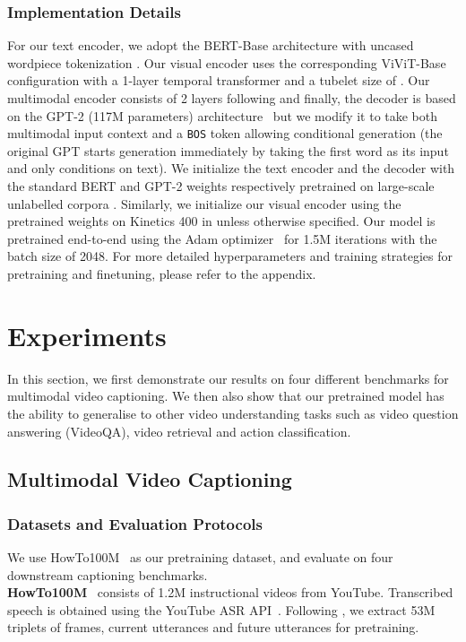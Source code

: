 \documentclass[10pt,twocolumn,letterpaper]{article}
\begin{document}
\subsubsection{Implementation Details}

For our text encoder, we adopt the BERT-Base architecture with uncased wordpiece tokenization \cite{devlin2018bert}.
Our visual encoder uses the corresponding ViViT-Base configuration with a 1-layer temporal transformer and a tubelet size of  \cite{arnab2021vivit}.
Our multimodal encoder consists of 2 layers following \cite{seo2021look} and finally, the decoder is based on the GPT-2 (117M parameters) architecture~\cite{radford2019language} but we modify it to take both multimodal input context  and a \texttt{BOS} token allowing conditional generation (the original GPT starts generation immediately by taking the first word as its input and only conditions on text).
We initialize the text encoder and the decoder with the standard BERT and GPT-2 weights respectively pretrained on large-scale unlabelled corpora \cite{devlin2018bert,radford2019language}.
Similarly, we initialize our visual encoder using the pretrained weights on Kinetics 400 in \cite{arnab2021vivit} unless otherwise specified. Our model is pretrained end-to-end using the Adam optimizer~\cite{kingma2014adam} for 1.5M iterations with the batch size of 2048.
For more detailed hyperparameters and training strategies for pretraining and finetuning, please refer to the appendix.
 \section{Experiments}
In this section, we first demonstrate our results on four different benchmarks for multimodal video captioning. We then also show that our pretrained model has the ability to generalise to other video understanding tasks such as video question answering (VideoQA), video retrieval and action classification.

\subsection{Multimodal Video Captioning}
\label{sec:exp_captioning}


\subsubsection{Datasets and Evaluation Protocols}
We use HowTo100M~\cite{miech2019howto100m} as our pretraining dataset, and evaluate on four downstream captioning benchmarks. \\ \noindent\textbf{HowTo100M}~\cite{miech2019howto100m} consists of 1.2M instructional videos from YouTube. Transcribed speech is obtained using the YouTube ASR API~\cite{youtubeapi}.
Following \cite{seo2021look}, we extract 53M triplets of frames, current utterances and future utterances for pretraining.
\end{document}
